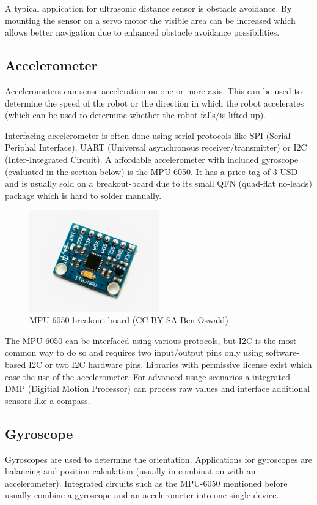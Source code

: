 A typical application for ultrasonic distance sensor is obstacle avoidance. By mounting the sensor on a servo motor the visible area can be increased which allows better navigation due to enhanced obstacle avoidance possibilities. \cite[p. 338]{niku2001introduction}

\subsection{Accelerometer}
Accelerometers can sense acceleration on one or more axis. This can be used to determine the speed of the robot or the direction in which the robot accelerates (which can be used to determine whether the robot falls/is lifted up). 

Interfacing accelerometer is often done using serial protocols like SPI (Serial Periphal Interface), UART (Universal asynchronous receiver/transmitter) or I2C (Inter-Integrated Circuit). A affordable accelerometer with included gyroscope (evaluated in the section below) is the MPU-6050. It has a price tag of 3 USD and is usually sold on a breakout-board due to its small QFN (quad-flat no-leads) package which is hard to solder manually. 

\begin{figure}[H]
  \centering
  \includegraphics[width=0.5\textwidth]{images/30_gyroaccel.jpg}
  \caption{MPU-6050 breakout board (CC-BY-SA Ben Oswald)}
\end{figure}

The MPU-6050 can be interfaced using various protocols, but I2C is the most common way to do so and requires two input/output pins only using software-based I2C or two I2C hardware pins. Libraries with permissive license exist which ease the use of the accelerometer. For advanced usage scenarios a integrated DMP (Digitial Motion Processor) can process raw values and interface additional sensors like a compass.

\subsection{Gyroscope}
Gyroscopes are used to determine the orientation. Applications for gyroscopes are balancing and position calculation (usually in combination with an accelerometer). Integrated circuits such as the MPU-6050 mentioned before usually combine a gyroscope and an accelerometer into one single device.

